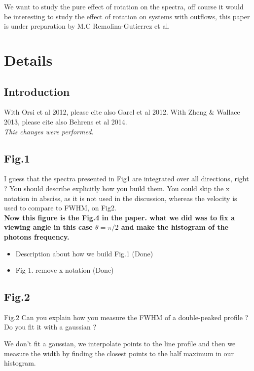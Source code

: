 \documentclass[12pt]{article}
\begin{document}
We want to study the pure effect of rotation on the spectra, off course it would
be interesting to study the effect of rotation on systems with outflows, this paper
is under preparation by M.C Remolina-Gutierrez et al.  

\section*{Details}

\subsection*{Introduction}

With Orsi et al 2012, please cite also Garel et al 2012. With Zheng \& Wallace 2013, please cite also Behrens et al 2014.\\

\textit{This changes were performed.}
\subsection*{Fig.1}

I guess that the spectra presented in Fig1 are integrated over all directions, right ? You should describe explicitly how you build them. You could skip the x notation in absciss, as it is not used in the discussion, whereas the velocity is used to compare to FWHM, on Fig2.\\

\textbf{Now this figure is the Fig.4 in the paper. what we did was to fix a viewing angle in this case $\theta= \pi/2$ and make the histogram of the photons frequency.}

\begin{itemize}
\item Description about how we build Fig.1 (Done)
\item Fig 1. remove x notation (Done)
\end{itemize}

\subsection*{Fig.2}

Fig.2 Can you explain how you measure the FWHM of a double-peaked profile ? Do you fit it with a gaussian ?


We don't fit a gaussian, we interpolate points to the line profile and then  we measure the width by finding
the closest points to the half maximum in our histogram.
\end{document}
